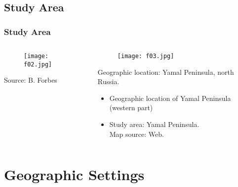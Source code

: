 \documentclass[pdflatex,compress,8pt,
	xcolor={dvipsnames,dvipsnames,svgnames,x11names,table},
	hyperref={colorlinks = true,breaklinks = true, urlcolor = NavyBlue, breaklinks = true}]{beamer}
\begin{document}
\subsection{Study Area}
\begin{frame}\frametitle{Study Area}
\begin{minipage}[0.4\textheight]{\textwidth}
\begin{columns}[T]
\begin{column}{0.5\textwidth}
\vspace{2em}
\begin{figure}[H]
	\centering
		\texttt{[image: f02.jpg]}
\end{figure}
Source: B. Forbes
\end{column}
\begin{column}{0.5\textwidth}
\vspace{2em}
\begin{figure}[H]
	\centering
		\texttt{[image: f03.jpg]}
\end{figure}
Geographic location: Yamal Peninsula, north Russia.
\begin{itemize} 
	\item Geographic location of Yamal Peninsula (western part)
	\item Study area: Yamal Peninsula. \\Map source: Web.
\end{itemize}
\end{column}
\end{columns}
\end{minipage}
\end{frame}

\section{Geographic Settings}
\end{document}
